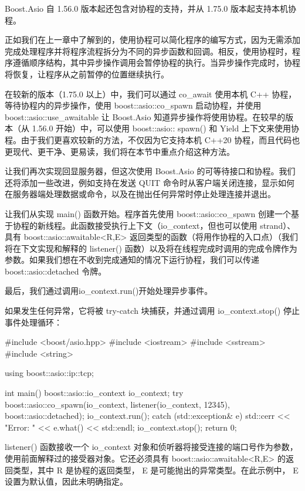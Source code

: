 Boost.Asio 自 1.56.0 版本起还包含对协程的支持，并从 1.75.0 版本起支持本机协程。

正如我们在上一章中了解到的，使用协程可以简化程序的编写方式，因为无需添加完成处理程序并将程序流程拆分为不同的异步函数和回调。相反，使用协程时，程序遵循顺序结构，其中异步操作调用会暂停协程的执行。当异步操作完成时，协程将恢复，让程序从之前暂停的位置继续执行。

在较新的版本（1.75.0 以上）中，我们可以通过 co\_await 使用本机 C++ 协程，等待协程内的异步操作，使用 boost::asio::co\_spawn 启动协程，并使用 boost::asio::use\_awaitable 让 Boost.Asio 知道异步操作将使用协程。在较早的版本（从 1.56.0 开始）中，可以使用 boost::asio:: spawn() 和 Yield 上下文来使用协程。由于我们更喜欢较新的方法，不仅因为它支持本机 C++20 协程，而且代码也更现代、更干净、更易读，我们将在本节中重点介绍这种方法。

让我们再次实现回显服务器，但这次使用 Boost.Asio 的可等待接口和协程。我们还将添加一些改进，例如支持在发送 QUIT 命令时从客户端关闭连接，显示如何在服务器端处理数据或命令，以及在抛出任何异常时停止处理连接并退出。

让我们从实现 main() 函数开始。程序首先使用 boost::asio::co\_spawn 创建一个基于协程的新线程。此函数接受执行上下文（io\_context，但也可以使用 strand）、具有 boost::asio::awaitable<R,E> 返回类型的函数（将用作协程的入口点）（我们将在下文实现和解释的 listener() 函数）以及将在线程完成时调用的完成令牌作为参数。如果我们想在不收到完成通知的情况下运行协程，我们可以传递 boost::asio::detached 令牌。

最后，我们通过调用io\_context.run()开始处理异步事件。

如果发生任何异常，它将被 try-catch 块捕获，并通过调用 io\_context.stop() 停止事件处理循环：

\begin{cpp}
#include <boost/asio.hpp>
#include <iostream>
#include <sstream>
#include <string>

using boost::asio::ip::tcp;

int main() {
    boost::asio::io_context io_context;
    try {
        boost::asio::co_spawn(io_context,
                    listener(io_context, 12345),
                    boost::asio::detached);
        io_context.run();
    } catch (std::exception& e) {
        std::cerr << "Error: " << e.what() << std::endl;
        io_context.stop();
    }
    return 0;
}
\end{cpp}

listener() 函数接收一个 io\_context 对象和侦听器将接受连接的端口号作为参数，使用前面解释过的接受器对象。它还必须具有 boost::asio::awaitable<R,E> 的返回类型，其中 R 是协程的返回类型， E 是可能抛出的异常类型。在此示例中， E 设置为默认值，因此未明确指定。

